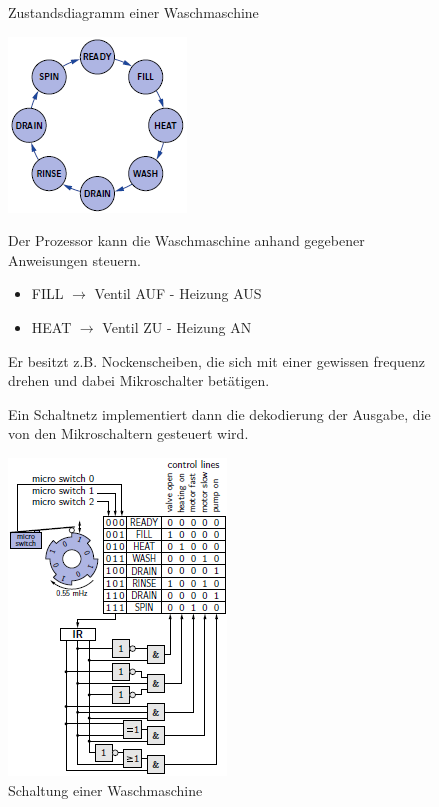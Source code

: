 \documentclass[12pt]{report}
\begin{document}
\begin{figure}[H]
  \begin{minipage}[t]{0.45\textwidth}
    \caption{Zustandsdiagramm einer Waschmaschine}
    \label{waschmaschine_zustaende}
    \begin{center}
      \includegraphics{waschmaschine_zustaende}
    \end{center}
    Der Prozessor kann die Waschmaschine anhand gegebener Anweisungen steuern.
    
    \begin{itemize}
      \item FILL $\rightarrow$ Ventil AUF - Heizung AUS
      \item HEAT  $\rightarrow$ Ventil ZU - Heizung AN
    \end{itemize}
    
    Er besitzt z.B. Nockenscheiben, die sich mit einer gewissen frequenz drehen und dabei Mikroschalter betätigen.
    
    Ein Schaltnetz implementiert dann die dekodierung der Ausgabe, die von den Mikroschaltern gesteuert wird.
  \end{minipage}
  \hfill
  \begin{minipage}[t]{0.45\textwidth}
    \caption{Schaltung einer Waschmaschine}
    \label{waschmaschine_schaltung}
    \centering
    \includegraphics{waschmaschine_schaltung}
  \end{minipage}
\end{figure}
\end{document}
